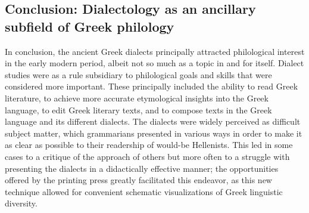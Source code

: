 \documentclass[output=paper]{langsci/langscibook}
\begin{document}
\subsection{Conclusion: Dialectology as an ancillary subfield of Greek philology}
\hypertarget{Toc19704825}{}
In conclusion, the ancient Greek dialects principally attracted philological interest in the early modern period, albeit not so much as a topic in and for itself. Dialect studies were as a rule subsidiary to philological goals and skills that were considered more important. These principally included the ability to read Greek literature, to achieve more accurate etymological insights into the Greek language, to edit Greek literary texts, and to compose texts in the Greek language and its different dialects. The dialects were widely perceived as difficult subject matter, which grammarians presented in various ways in order to make it as clear as possible to their readership of would-be Hellenists. This led in some cases to a critique of the approach of others but more often to a struggle with presenting the dialects in a didactically effective manner; the opportunities offered by the printing press greatly facilitated this endeavor, as this new technique allowed for convenient schematic visualizations of Greek linguistic diversity.
\end{document}
